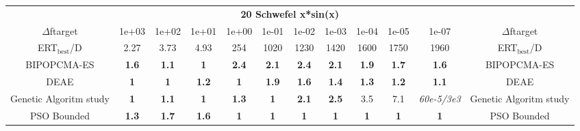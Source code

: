 \begin{tabular}{cccccccccccc}
 & \multicolumn{10}{c}{{\normalsize \textbf{20 Schwefel x*sin(x)}}}\\
$\Delta$ftarget& 1e+03& 1e+02& 1e+01& 1e+00& 1e-01& 1e-02& 1e-03& 1e-04& 1e-05& 1e-07 & $\Delta$ftarget \\
ERT$_{\textrm{best}}$/D& 2.27& 3.73& 4.93& 254& 1020& 1230& 1420& 1600& 1750& 1960 & ERT$_{\textrm{best}}$/D \\
\hline
BIPOPCMA-ES & \textbf{1.6} & \textbf{1.1} & \textbf{1} & \textbf{2.4} & \textbf{2.1} & \textbf{2.4} & \textbf{2.1} & \textbf{1.9} & \textbf{1.7} & \textbf{1.6} & BIPOPCMA-ES \cite{add_an_entry_for_BIPOPCMA-ES_in_bbob.bib}\\
DEAE & \textbf{1} & \textbf{1} & \textbf{1.2} & \textbf{1} & \textbf{1.9} & \textbf{1.6} & \textbf{1.4} & \textbf{1.3} & \textbf{1.2} & \textbf{1.1} & DEAE \cite{add_an_entry_for_DEAE_in_bbob.bib}\\
Genetic Algoritm study & \textbf{1} & \textbf{1.1} & \textbf{1} & \textbf{1.3} & \textbf{1} & \textbf{2.1} & \textbf{2.5} & 3.5 & 7.1 & \textit{60e-5}\textit{/3e3} & Genetic Algoritm study \cite{add_an_entry_for_Genetic Algoritm study_in_bbob.bib}\\
PSO Bounded & \textbf{1.3} & \textbf{1.7} & \textbf{1.6} & \textbf{1} & \textbf{1} & \textbf{1} & \textbf{1} & \textbf{1} & \textbf{1} & \textbf{1} & PSO Bounded \cite{add_an_entry_for_PSO Bounded_in_bbob.bib}
\end{tabular}
